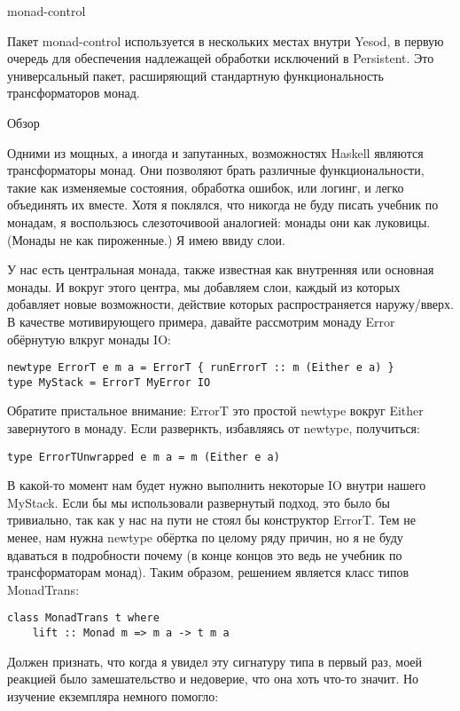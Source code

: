 monad-control

Пакет monad-control используется в нескольких местах внутри Yesod, в первую очередь для обеспечения надлежащей обработки исключений в Persistent. Это универсальный пакет, расширяющий стандартную функциональность трансформаторов монад.

Обзор

Одними из мощных, а иногда и запутанных, возможностях Haskell являются  трансформаторы монад. Они позволяют брать различные функциональности, такие как изменяемые состояния, обработка ошибок, или логинг, и легко объединять их вместе. Хотя я поклялся, что никогда не буду писать учебник по монадам, я воспользюсь слезоточивоой аналогией: монады они как луковицы. (Монады не как пироженные.) Я имею ввиду слои.

У нас есть центральная монада, также известная как внутренняя или основная монады. И вокруг этого центра, мы добавляем слои, каждый из которых добавляет новые возможности, действие которых распространяется наружу/вверх. В качестве мотивирующего примера, давайте рассмотрим монаду Error обёрнутую влкруг монады IO:

\begin{lstlisting}
newtype ErrorT e m a = ErrorT { runErrorT :: m (Either e a) }
type MyStack = ErrorT MyError IO
\end{lstlisting}

Обратите пристальное внимание: ErrorT это простой newtype вокруг Either завернутого в монаду. Если развернкть, избавляясь от newtype, получиться:

\begin{lstlisting}
type ErrorTUnwrapped e m a = m (Either e a)
\end{lstlisting}

В какой-то момент нам будет нужно выполнить некоторые IO внутри нашего MyStack. Если бы мы использовали развернутый подход, это было бы тривиально, так как у нас на пути не стоял бы конструктор ErrorT. Тем не менее, нам нужна newtype обёртка по целому ряду причин, но я не буду вдаваться в подробности почему (в конце концов это ведь не учебник по трансформаторам монад). Таким образом, решением является класс типов MonadTrans:

\begin{lstlisting}
class MonadTrans t where
    lift :: Monad m => m a -> t m a
\end{lstlisting}

Должен признать, что когда я увидел эту сигнатуру типа в первый раз, моей реакцией было замешательство и недоверие, что она хоть что-то значит. Но изучение екземпляра немного помогло:

